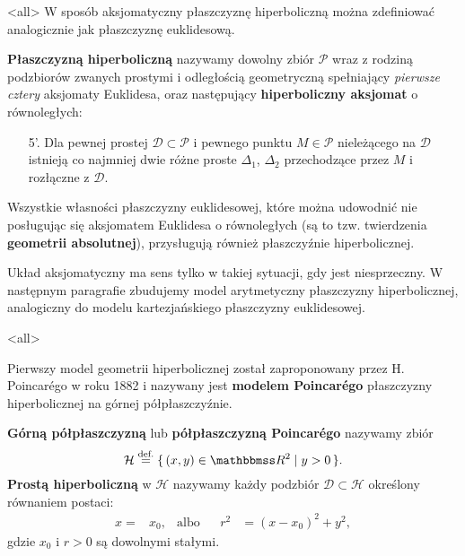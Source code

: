 \mode<all>{}
W sposób aksjomatyczny płaszczyznę hiperboliczną można zdefiniować analogicznie jak płaszczyznę euklidesową.
\begin{frame}
\begin{definicja}
\textbf{Płaszczyzną hiperboliczną} nazywamy dowolny zbiór $\mathcal{P}$ wraz z rodziną podzbiorów zwanych prostymi i odległością geometryczną spełniający \textit{pierwsze cztery} aksjomaty Euklidesa, oraz następujący \textbf{hiperboliczny aksjomat} o równoległych:
\begin{itemize}
\pause \item [5'.] Dla pewnej prostej $\mathcal{D}\subset \mathcal{P}$ i pewnego punktu $M\in \mathcal{P}$ nieleżącego na $\mathcal{D}$ istnieją co najmniej dwie różne proste $\Delta_1$, $\Delta_2$ przechodzące przez $M$ i rozłączne z $\mathcal{D}$.
\end{itemize}
\end{definicja}
\pause 
\begin{uwaga}
Wszystkie własności płaszczyzny euklidesowej, które można udowodnić nie posługując się aksjomatem Euklidesa o równoległych (są to tzw. twierdzenia \textbf{geometrii absolutnej}), przysługują również płaszczyźnie hiperbolicznej.
\end{uwaga}

\end{frame}

Układ aksjomatyczny ma sens tylko w takiej sytuacji, gdy jest niesprzeczny. 
W następnym paragrafie zbudujemy model arytmetyczny płaszczyzny hiperbolicznej, analogiczny do modelu
kartezjańskiego płaszczyzny euklidesowej. 

\mode<all>{}
\begin{frame}
Pierwszy model geometrii hiperbolicznej został zaproponowany przez H. Poincar\'{e}go w roku 1882 i nazywany jest 
\textbf{modelem Poincar\'{e}go} płaszczyzny hiperbolicznej na górnej półpłaszczyźnie.

\pause\begin{definicja} 
\textbf{Górną półpłaszczyzną} lub \textbf{półpłaszczyzną Poincar\'{e}go}
nazywamy zbiór \[\mathcal{H}\define\{\,(x,y)\in \R^2\mid y>0\,\}.\]
\pause \textbf{Prostą hiperboliczną} w $\mathcal{H}$ nazywamy każdy podzbiór 
$\mathcal{D}\subset \mathcal{H}$ określony równaniem postaci: 
\begin{align*}
x=&x_{0}, & \text{albo} & & r^2&=(x-x_{0})^{2}+y^{2},
\end{align*}gdzie $x_{0}$ i $r>0$ są dowolnymi stałymi.
\end{definicja}

\end{frame}

